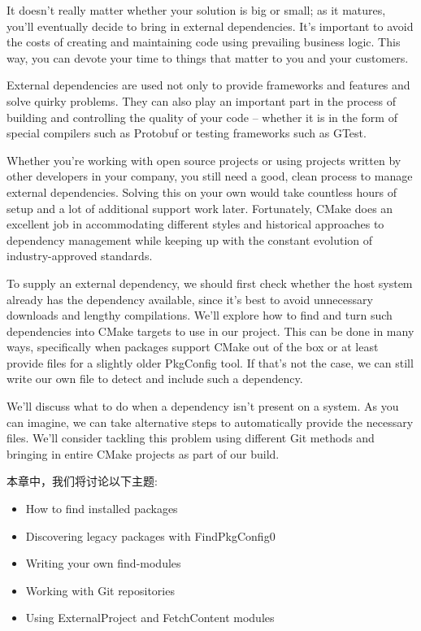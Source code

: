 It doesn't really matter whether your solution is big or small; as it matures, you'll eventually decide to bring in external dependencies. It's important to avoid the costs of creating and maintaining code using prevailing business logic. This way, you can devote your time to things that matter to you and your customers.

External dependencies are used not only to provide frameworks and features and solve quirky problems. They can also play an important part in the process of building and controlling the quality of your code – whether it is in the form of special compilers such as Protobuf or testing frameworks such as GTest.

Whether you're working with open source projects or using projects written by other developers in your company, you still need a good, clean process to manage external dependencies. Solving this on your own would take countless hours of setup and a lot of additional support work later. Fortunately, CMake does an excellent job in accommodating different styles and historical approaches to dependency management while keeping up with the constant evolution of industry-approved standards.

To supply an external dependency, we should first check whether the host system already has the dependency available, since it's best to avoid unnecessary downloads and lengthy compilations. We'll explore how to find and turn such dependencies into CMake targets to use in our project. This can be done in many ways, specifically when packages support CMake out of the box or at least provide files for a slightly older PkgConfig tool. If that's not the case, we can still write our own file to detect and include such a dependency.

We'll discuss what to do when a dependency isn't present on a system. As you can imagine, we can take alternative steps to automatically provide the necessary files. We'll consider tackling this problem using different Git methods and bringing in entire CMake projects as part of our build.

本章中，我们将讨论以下主题:

\begin{itemize}
\item 
How to find installed packages

\item 
Discovering legacy packages with FindPkgConfig0

\item 
Writing your own find-modules

\item 
Working with Git repositories

\item 
Using ExternalProject and FetchContent modules
\end{itemize}
